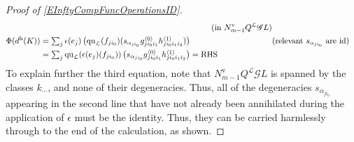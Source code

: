 \documentclass[11pt]{amsart} \renewcommand{\baselinestretch}{1.4}
\theoremstyle{plain}
\theoremstyle{definition}
\newcommand{\scrG}{\mathscr{G}}
\newcommand{\call}{\mathcal{L}}
\newcommand{\BSW}{{\scrG}}
\newcommand{\quadratic}{\mathrm{qu}}
\newcommand{\Id}{\mathrm{id}}
\newcommand{\uver}{^\mathrm{v}}
\newcommand{\uhor}{^\mathrm{h}}
\begin{document}
\begin{Operations in composite functor spectral sequences}
\begin{proof}[Proof of \ref{EInftyCompFuncOperationsID}]
\begin{alignat*}{2}
&\qquad&\text{(in $N\uver_{m-1}Q^{\call}\BSW L)$}\\
\Phi(d\uhor(K))&=
\textstyle\sum_j \epsilon (e_j)\left( {\quadratic_\call}(f_{ji_0})(s_{\alpha_{ji_0}}g^{\smash{\langle} 0\smash{\rangle}}_{ji_0i_1}h^{\smash{\langle} 1\smash{\rangle}}_{ji_0i_1i_2})\right)%
&\qquad&\text{(relevant $s_{\alpha_{ji_0}}$ are $\Id$)}\\
&=
\textstyle\sum_j {\quadratic_\call}(\epsilon (e_j)(f_{ji_0}))\left(s_{\alpha_{ji_0}} {g^{\smash{\langle} 0\smash{\rangle}}_{ji_0i_1}h^{\smash{\langle} 1\smash{\rangle}}_{ji_0i_1i_2}}\right) ={}\makebox[0cm][l]{\textup{RHS}}.
\end{alignat*}
To explain further the third equation, note that $N\uver_{m-1}Q^{\call}\BSW L$ is spanned by the classes $k_{\cdots }$, and none of  their degeneracies. Thus, all of the degeneracies $s_{\alpha_{ji_0}}$ appearing in the second line that have not already been annihilated during the application of $\epsilon$ must be the identity. Thus, they can be carried harmlessly through to the end of the calculation, as shown.
\end{proof}













\end{Operations in composite functor spectral sequences}
\end{document}
